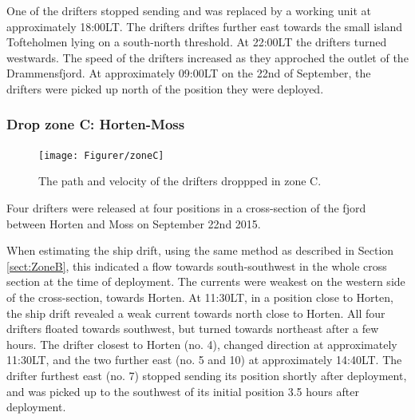 \documentclass[12pt,a4paper,english]{article}
\begin{document}
One of the drifters stopped sending and was replaced by a working unit at approximately 18:00LT. The drifters driftes further east towards the small island Tofteholmen lying on a south-north threshold. At 22:00LT the drifters turned westwards. The speed of the drifters increased as they approched the outlet of the Drammensfjord.%
At approximately 09:00LT on the 22nd of September, the drifters were picked up north of the position they were deployed.

\subsubsection{Drop zone C: Horten-Moss}
%
\begin{figure}[ht]
\centerline{
\texttt{[image: Figurer/zoneC]}}
\caption{\small
The path and velocity of the drifters droppped in zone C.}
\label{fig:ZoneC}
\end{figure}
%
%
Four drifters were released at four positions in a cross-section of the fjord between Horten and Moss on September 22nd 2015.%

When estimating the ship drift, using the same method as described in Section \ref{sect:ZoneB}, this indicated a flow towards south-southwest in the whole cross section at the time of deployment. The currents were weakest on the western side of the cross-section, towards Horten. At 11:30LT, in a position close to Horten, the ship drift revealed a weak current towards north close to Horten. All four drifters floated towards southwest, but turned towards northeast after a few hours. The drifter closest to Horten (no. 4), changed direction at approximately 11:30LT, and the two further east (no. 5 and 10) at approximately 14:40LT. The drifter furthest east (no. 7) stopped sending its position shortly after deployment, and was picked up to the southwest of its initial position 3.5 hours after deployment.
\end{document}
